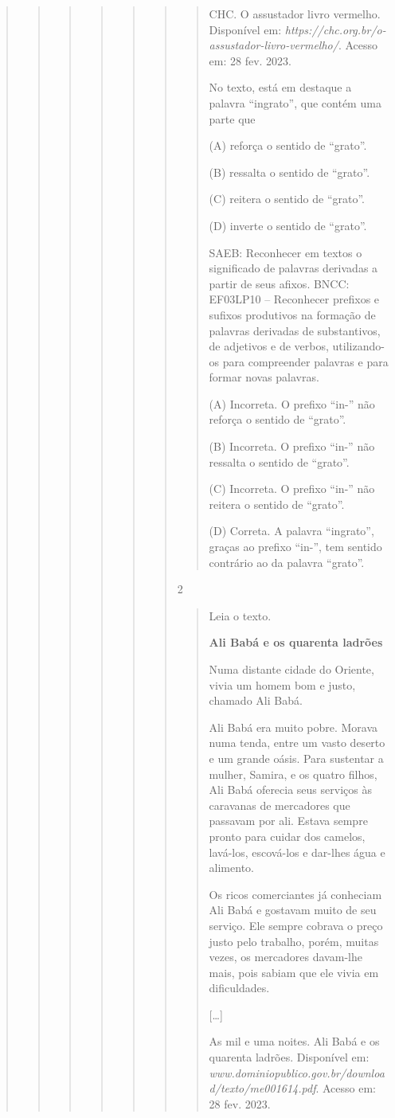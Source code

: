 \begin{boxlist}
{{\begin{quote}
\begin{quote}
\begin{quote}
{\begin{quote}
{\begin{quote}
\begin{quote}
\begin{quote}
CHC. O assustador livro vermelho. Disponível em:
\emph{https://chc.org.br/o-assustador-livro-vermelho/}. Acesso em: 28
fev. 2023.

No texto, está em destaque a palavra ``ingrato'', que contém uma parte que

(A) reforça o sentido de ``grato''.

(B) ressalta o sentido de ``grato''.

(C) reitera o sentido de ``grato''.

(D) inverte o sentido de ``grato''.

SAEB: Reconhecer em textos o significado de palavras derivadas a partir de seus afixos.
BNCC: EF03LP10 -- Reconhecer prefixos e sufixos produtivos na formação de
palavras derivadas de substantivos, de adjetivos e de verbos,
utilizando-os para compreender palavras e para formar novas palavras.

(A) Incorreta. O prefixo ``in-'' não reforça o sentido de ``grato''.

(B) Incorreta. O prefixo ``in-'' não ressalta o sentido de ``grato''.

(C) Incorreta. O prefixo ``in-'' não reitera o sentido de ``grato''.

(D) Correta. A palavra ``ingrato'', graças ao prefixo ``in-'', tem sentido contrário ao da palavra ``grato''.
\end{quote}

\num{2}

\begin{quote}
Leia o texto.

\textbf{Ali Babá e os quarenta ladrões}

Numa distante cidade do Oriente, vivia um homem bom e justo, chamado Ali
Babá.

Ali Babá era muito pobre. Morava numa tenda, entre um vasto deserto e um
grande oásis. Para sustentar a mulher, Samira, e os quatro filhos, Ali
Babá oferecia seus serviços às caravanas de mercadores que passavam por
ali. Estava sempre pronto para cuidar dos camelos, lavá-los, escová-los
e dar-lhes água e alimento.

Os ricos comerciantes já conheciam Ali Babá e gostavam muito de seu
serviço. Ele sempre cobrava o preço justo pelo trabalho, porém, muitas
vezes, os mercadores davam-lhe mais, pois sabiam que ele vivia em
dificuldades.

{[}\ldots{}{]}

As mil e uma noites. Ali Babá e os quarenta ladrões. Disponível em:
\emph{www.dominiopublico.gov.br/download/texto/me001614.pdf}. Acesso em: 28
fev. 2023.


\end{quote}
\end{quote}
\end{quote}}
\end{quote}}
\end{quote}
\end{quote}
\end{quote}}}
\end{boxlist}
